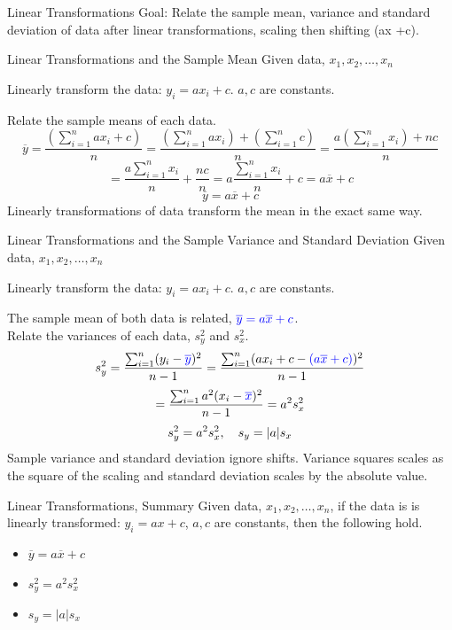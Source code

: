 \documentclass{beamer}
\newcommand{\blue}[1]{{\color{blue} #1}}
\begin{document}
\begin{frame}{Linear Transformations}
    Goal: Relate the sample mean, variance and standard deviation of data after linear transformations, scaling then shifting (ax +c).
\end{frame}

\begin{frame}{Linear Transformations and the Sample Mean}
    Given data, $x_1, x_2, \ldots, x_n$
    \begin{center}
        Linearly transform the data: $y_i = a x_i+c$. $a,c$ are constants.
    \end{center}
    Relate the sample means of each data.
    \[\overline{y} = \frac{(\sum_{i=1}^n ax_i +c)}{n} = \frac{(\sum_{i=1}^n ax_i)+ (\sum_{i=1}^nc)}{n} = \frac{a(\sum_{i=1}^n x_i)+ nc}{n}\]
    \[ = \frac{a\sum_{i=1}^n x_i}{n} + \frac{nc}{n} = a\frac{\sum_{i=1}^n x_i}{n} + c = a\overline{x} + c\]
    \[\overline{y} = a \overline{x} + c\]
    Linearly transformations of data transform the mean in the exact same way.
\end{frame}

\begin{frame}{Linear Transformations and the Sample Variance and Standard Deviation}
    Given data, $x_1, x_2, \ldots, x_n$
    \begin{center}
        Linearly transform the data: $y_i = a x_i+c$. $a,c$ are constants.
    \end{center}
    The sample mean of both data is related, $\blue{\overline{y}=a\overline{x} + c}$.\\
    Relate the variances of each data, $s^2_y$ and $s_x^2$.
    \[s_y^2 = \frac{\sum_{i=1}^n (y_i - \blue{\overline{y}})^2}{n-1} = \frac{\sum_{i=1}^n (a x_i +c - \blue{(a \overline{x} + c)})^2}{n-1}\]
    \[= \frac{\sum_{i=1}^n a^2 ( x_i - \blue{\overline{x} })^2}{n-1} = a^2 s_x^2\]
    \[s_y^2 = a^2 s_x^2, \hskip 1em s_y = |a| s_x \]
    Sample variance and standard deviation ignore shifts. Variance squares scales as the square of the scaling and standard deviation scales by the absolute value.
\end{frame}

\begin{frame}{Linear Transformations, Summary}
    Given data, $x_1, x_2, \ldots, x_n$, if the data is is linearly transformed: $y_i = a x + c$, $a,c$ are constants, then the following hold.
    \begin{itemize}
        \item $\overline{y} = a \overline{x} + c$
        \item $s_y^2 = a^2 s_x^2$
        \item $s_y = |a| s_x$
    \end{itemize}
\end{frame}
\end{document}
